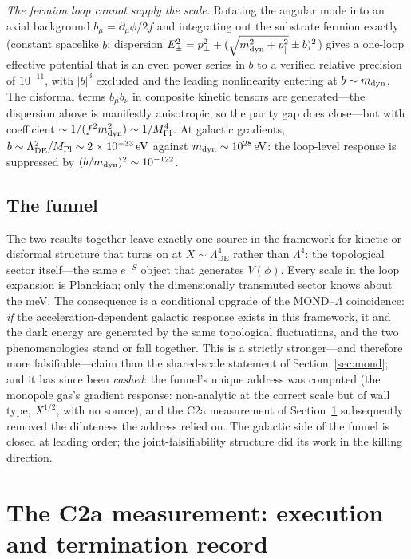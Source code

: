 \documentclass[11pt]{article}
\newcommand{\LDE}{\Lambda_{\mathrm{DE}}}
\begin{document}
\emph{The fermion loop cannot supply the scale.}
Rotating the angular mode into an axial background
$b_\mu = \partial_\mu\phi/2f$ and integrating out the substrate
fermion exactly (constant spacelike $b$; dispersion
$E_\pm^2 = p_\perp^2 + (\sqrt{m_{\rm dyn}^2 + p_\parallel^2} \pm
b)^2$) gives a one-loop effective potential that is an even power
series in $b$ to a verified relative precision of $10^{-11}$, with
$|b|^3$ excluded and the leading nonlinearity entering at
$b \sim m_{\rm dyn}$.  The disformal terms
$b_\mu b_\nu$ in composite kinetic tensors are generated---the
dispersion above is manifestly anisotropic, so the parity gap does
close---but with coefficient $\sim 1/(f^2 m_{\rm dyn}^2) \sim
1/M_{\rm Pl}^4$.  At galactic gradients,
$b \sim \LDE^2/M_{\rm Pl} \sim 2\times10^{-33}\,\mathrm{eV}$ against
$m_{\rm dyn} \sim 10^{28}\,\mathrm{eV}$: the loop-level response is
suppressed by $(b/m_{\rm dyn})^2 \sim 10^{-122}$.

\subsection{The funnel}

The two results together leave exactly one source in the framework
for kinetic or disformal structure that turns on at
$X \sim \LDE^4$ rather than $\Lambda^4$: the topological sector
itself---the same $e^{-S}$ object that generates $V(\phi)$.
Every scale in the loop expansion is Planckian; only the
dimensionally transmuted sector knows about the meV.  The
consequence is a conditional upgrade of the MOND--$\Lambda$
coincidence: \emph{if} the acceleration-dependent galactic response
exists in this framework, it and the dark energy are generated by
the same topological fluctuations, and the two phenomenologies stand
or fall together.  This is a strictly stronger---and therefore more
falsifiable---claim than the shared-scale statement of
Section~\ref{sec:mond}; and it has since been \emph{cashed}: the
funnel's unique address was computed (the monopole gas's gradient
response: non-analytic at the correct scale but of wall type,
$X^{1/2}$, with no source), and the C2a measurement of
Section~\ref{sec:monopole} subsequently removed the diluteness the
address relied on.  The galactic side of the funnel is closed at
leading order; the joint-falsifiability structure did its work in
the killing direction.

\section{The C2a measurement: execution and termination record}
\label{sec:monopole}
\end{document}
